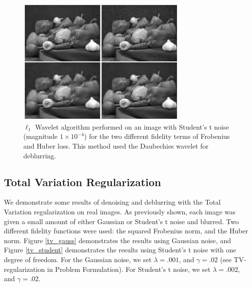 \documentclass[10pt,a4paper]{article}
\begin{document}
\begin{figure}[H]
\begin{center}
\includegraphics[width = 0.75\textwidth]{../figures/waveletStudentD.pdf} 
\end{center}
\caption{$\ell_1$ Wavelet algorithm performed on an image with Student's t noise (magnitude $1 \times 10^{-4}$) for the two different fidelity terms of Frobenius and Huber loss. This method used the Daubechies wavelet for deblurring.}
\label{waveletD_student}
\end{figure}

\subsection{Total Variation Regularization}

We demonstrate some results of denoising and deblurring with the Total Variation regularization on real images. As previously shown, each image was given a small amount of either Gaussian or Student's t noise and blurred. Two different fidelity functions were used: the squared Frobenius norm, and the Huber norm. Figure \ref{tv_gauss} demonstrates the results using Gaussian noise, and Figure \ref{tv_student} demonstrates the results using Student's t noise with one degree of freedom. For the Gaussian noise, we set $\lambda = .001$, and $\gamma = .02$ (see TV-regularization in Problem Formulation). For Student's t noise, we set $\lambda = .002$, and $\gamma = .02$.
\end{document}
